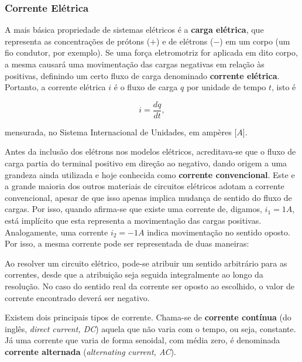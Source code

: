 \documentclass{article}
\numberwithin{equation}{section}
\begin{document}
\subsubsection{Corrente Elétrica}
\label{subsubsec:corrente}

A mais básica propriedade de sistemas elétricos é a \textbf{carga elétrica}, que representa as concentrações de prótons ($+$) e de elétrons ($-$) em um corpo (um fio condutor, por exemplo). Se uma força eletromotriz for aplicada em dito corpo, a mesma causará uma movimentação das cargas negativas em relação às positivas, definindo um certo fluxo de carga denominado \textbf{corrente elétrica}. Portanto, a corrente elétrica $i$ é o fluxo de carga $q$ por unidade de tempo $t$, isto é

\begin{equation}
    i = \dfrac{dq}{dt},
\end{equation}

\noindent mensurada, no Sistema Internacional de Unidades, em ampères [$A$].

Antes da inclusão dos elétrons nos modelos elétricos, acreditava-se que o fluxo de carga partia do terminal positivo em direção ao negativo, dando origem a uma grandeza ainda utilizada e hoje conhecida como \textbf{corrente convencional}. Este e a grande maioria dos outros materiais de circuitos elétricos adotam a corrente convencional, apesar de que isso apenas implica mudança de sentido do fluxo de cargas. Por isso, quando afirma-se que existe uma corrente de, digamos, $i_1=1A$, está implícito que esta representa a movimentação das cargas positivas. Analogamente, uma corrente $i_2=-1A$ indica movimentação no sentido oposto. Por isso, a mesma corrente pode ser representada de duas maneiras:

\begin{center}
\end{center}

Ao resolver um circuito elétrico, pode-se atribuir um sentido arbitrário para as correntes, desde que a atribuição seja seguida integralmente ao longo da resolução. No caso do sentido real da corrente ser oposto ao escolhido, o valor de corrente encontrado deverá ser negativo.

Existem dois principais tipos de corrente. Chama-se de \textbf{corrente contínua} (do inglês, \textit{direct current, DC}) aquela que não varia com o tempo, ou seja, constante. Já uma corrente que varia de forma senoidal, com média zero, é denominada \textbf{corrente alternada} (\textit{alternating current, AC}).
\end{document}
